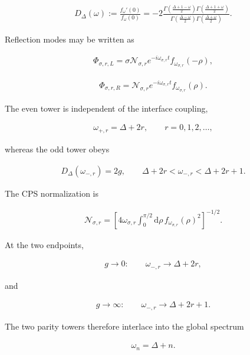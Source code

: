 \begin{align}
D_\Delta(\omega)
:=\frac{f_\omega'(0)}{f_\omega(0)}
=-2
\frac{
\Gamma\left(\frac{\Delta+1-\omega}{2}\right)
\Gamma\left(\frac{\Delta+1+\omega}{2}\right)
}{
\Gamma\left(\frac{\Delta-\omega}{2}\right)
\Gamma\left(\frac{\Delta+\omega}{2}\right)
}.
\end{align}

Reflection modes may be written as

\begin{align}
\Phi_{\sigma,r,L}
=\sigma\mathcal N_{\sigma,r}e^{-i\omega_{\sigma,r}t}
f_{\omega_{\sigma,r}}(-\rho),
\end{align}

\begin{align}
\Phi_{\sigma,r,R}
=\mathcal N_{\sigma,r}e^{-i\omega_{\sigma,r}t}
f_{\omega_{\sigma,r}}(\rho).
\end{align}

The even tower is independent of the interface coupling,

\begin{align}
\omega_{+,r}=\Delta+2r,
\qquad
r=0,1,2,\ldots,
\end{align}

whereas the odd tower obeys

\begin{align}
D_\Delta(\omega_{-,r})=2g,
\qquad
\Delta+2r<\omega_{-,r}<\Delta+2r+1.
\end{align}

The CPS normalization is

\begin{align}
\mathcal N_{\sigma,r}
=\left[
4\omega_{\sigma,r}
\int_0^{\pi/2}\mathrm d\rho\,
f_{\omega_{\sigma,r}}(\rho)^2
\right]^{-1/2}.
\end{align}

At the two endpoints,

\begin{align}
g\to0:
\qquad
\omega_{-,r}\to\Delta+2r,
\end{align}

and

\begin{align}
g\to\infty:
\qquad
\omega_{-,r}\to\Delta+2r+1.
\end{align}

The two parity towers therefore interlace into the global spectrum

\begin{align}
\omega_n=\Delta+n.
\end{align}

